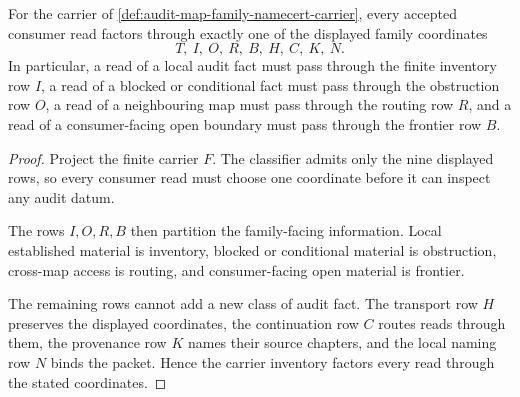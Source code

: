 \begin{theorem}
\label{thm:audit-map-family-inventory-factorization}
For the carrier of \autoref{def:audit-map-family-namecert-carrier}, every accepted consumer read factors through exactly one of the displayed family coordinates
$$
T,\ I,\ O,\ R,\ B,\ H,\ C,\ K,\ N.
$$
In particular, a read of a local audit fact must pass through the finite inventory row $I$, a read of a blocked or conditional fact must pass through the obstruction row $O$, a read of a neighbouring map must pass through the routing row $R$, and a read of a consumer-facing open boundary must pass through the frontier row $B$.
\end{theorem}
\begin{proof}
Project the finite carrier $F$. The classifier admits only the nine displayed rows, so every consumer read must choose one coordinate before it can inspect any audit datum.

The rows $I,O,R,B$ then partition the family-facing information. Local established material is inventory, blocked or conditional material is obstruction, cross-map access is routing, and consumer-facing open material is frontier.

The remaining rows cannot add a new class of audit fact. The transport row $H$ preserves the displayed coordinates, the continuation row $C$ routes reads through them, the provenance row $K$ names their source chapters, and the local naming row $N$ binds the packet. Hence the carrier inventory factors every read through the stated coordinates.
\end{proof}

